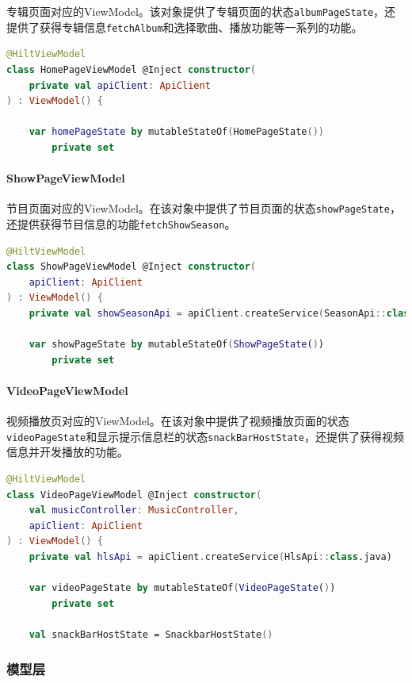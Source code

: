 \documentclass[main.tex]{subfiles}
\begin{document}
专辑页面对应的ViewModel。该对象提供了专辑页面的状态\texttt{albumPageState}，还提供了获得专辑信息\texttt{fetchAlbum}和选择歌曲、播放功能等一系列的功能。

\begin{lstlisting}[language=Kotlin]
@HiltViewModel
class HomePageViewModel @Inject constructor(
    private val apiClient: ApiClient
) : ViewModel() {

    var homePageState by mutableStateOf(HomePageState())
        private set
\end{lstlisting}

\paragraph{ShowPageViewModel} 

节目页面对应的ViewModel。在该对象中提供了节目页面的状态\texttt{showPageState}，还提供获得节目信息的功能\texttt{fetchShowSeason}。

\begin{lstlisting}[language=Kotlin]
@HiltViewModel
class ShowPageViewModel @Inject constructor(
    apiClient: ApiClient
) : ViewModel() {
    private val showSeasonApi = apiClient.createService(SeasonApi::class.java)

    var showPageState by mutableStateOf(ShowPageState())
        private set
\end{lstlisting}

\paragraph{VideoPageViewModel} 

视频播放页对应的ViewModel。在该对象中提供了视频播放页面的状态\texttt{videoPageState}和显示提示信息栏的状态\texttt{snackBarHostState}，还提供了获得视频信息并开发播放的功能。

\begin{lstlisting}[language=Kotlin]
@HiltViewModel
class VideoPageViewModel @Inject constructor(
    val musicController: MusicController,
    apiClient: ApiClient
) : ViewModel() {
    private val hlsApi = apiClient.createService(HlsApi::class.java)

    var videoPageState by mutableStateOf(VideoPageState())
        private set

    val snackBarHostState = SnackbarHostState()
\end{lstlisting}

\subsubsection{模型层}
\end{document}
